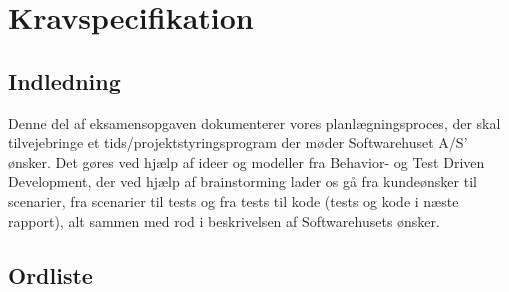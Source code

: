 \section{Kravspecifikation}
\subsection{Indledning}
Denne del af eksamensopgaven dokumenterer vores planlægningsproces, der skal tilvejebringe et tids/projektstyringsprogram der møder Softwarehuset A/S' ønsker. Det gøres ved hjælp af ideer og modeller fra Behavior- og Test Driven Development, der ved hjælp af brainstorming lader os gå fra kundeønsker til scenarier, fra scenarier til tests og fra tests til kode (tests og kode i næste rapport), alt sammen med rod i beskrivelsen af Softwarehusets ønsker.
\subsection{Ordliste}
